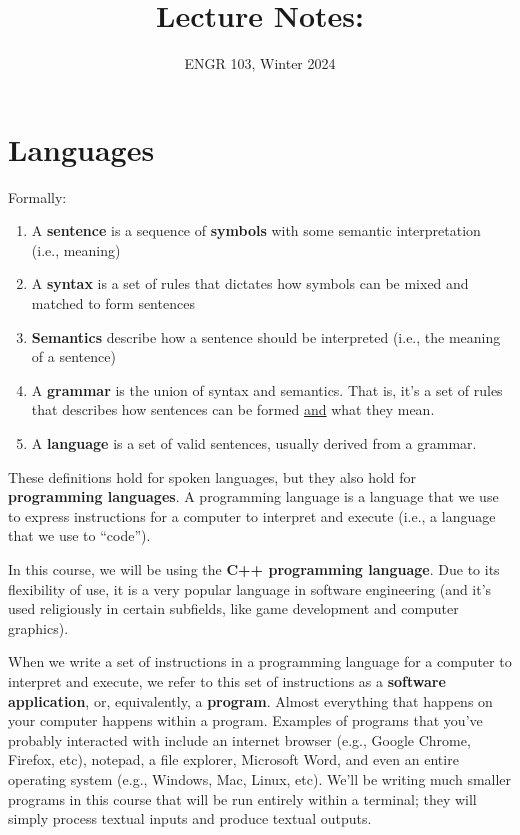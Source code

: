 \documentclass{article}
\title{
    Lecture Notes: \lecturetitle
}
\author{ENGR 103, Winter 2024}
\date{}
\begin{document}
\maketitle

\section{Languages}

Formally:

\begin{enumerate}
    \item A \textbf{sentence} is a sequence of \textbf{symbols} with some semantic interpretation (i.e., meaning)
    \item A \textbf{syntax} is a set of rules that dictates how symbols can be mixed and matched to form sentences
    \item \textbf{Semantics} describe how a sentence should be interpreted (i.e., the meaning of a sentence)
    \item A \textbf{grammar} is the union of syntax and semantics. That is, it's a set of rules that describes how sentences can be formed \ul{and} what they mean.
    \item A \textbf{language} is a set of valid sentences, usually derived from a grammar.
\end{enumerate}

These definitions hold for spoken languages, but they also hold for \textbf{programming languages}. A programming language is a language that we use to express instructions for a computer to interpret and execute (i.e., a language that we use to ``code'').

In this course, we will be using the \textbf{C++ programming language}. Due to its flexibility of use, it is a very popular language in software engineering (and it's used religiously in certain subfields, like game development and computer graphics).

When we write a set of instructions in a programming language for a computer to interpret and execute, we refer to this set of instructions as a \textbf{software application}, or, equivalently, a \textbf{program}. Almost everything that happens on your computer happens within a program. Examples of programs that you've probably interacted with include an internet browser (e.g., Google Chrome, Firefox, etc), notepad, a file explorer, Microsoft Word, and even an entire operating system (e.g., Windows, Mac, Linux, etc). We'll be writing much smaller programs in this course that will be run entirely within a terminal; they will simply process textual inputs and produce textual outputs.
\end{document}
